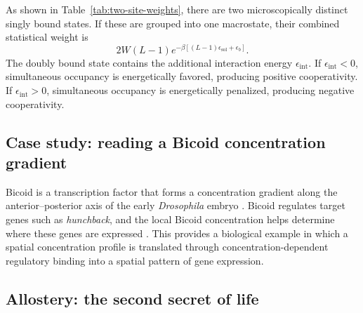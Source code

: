 
As shown in Table~\ref{tab:two-site-weights}, there are two microscopically distinct singly bound states.
If these are grouped into one macrostate, their combined statistical weight is
\[
    2W(L-1)e^{-\beta[(L-1)\epsilon_{\mathrm{sol}}+\epsilon_b]}.
\]
The doubly bound state contains the additional interaction energy $\epsilon_{\mathrm{int}}$.
If $\epsilon_{\mathrm{int}}<0$, simultaneous occupancy is energetically favored, producing positive cooperativity.
If $\epsilon_{\mathrm{int}}>0$, simultaneous occupancy is energetically penalized, producing negative cooperativity.


\subsection{Case study: reading a Bicoid concentration gradient}
\label{sec:bicoid}



Bicoid is a transcription factor that forms a concentration gradient along the anterior--posterior axis of the early \textit{Drosophila} embryo \cite{driever1988gradient}.
Bicoid regulates target genes such as \textit{hunchback}, and the local Bicoid concentration helps determine where these genes are expressed \cite{driever1989bicoid,driever1989determination}.
This provides a biological example in which a spatial concentration profile is translated through concentration-dependent regulatory binding into a spatial pattern of gene expression.





\subsection{Allostery: the second secret of life}
\label{sec:allostery}


